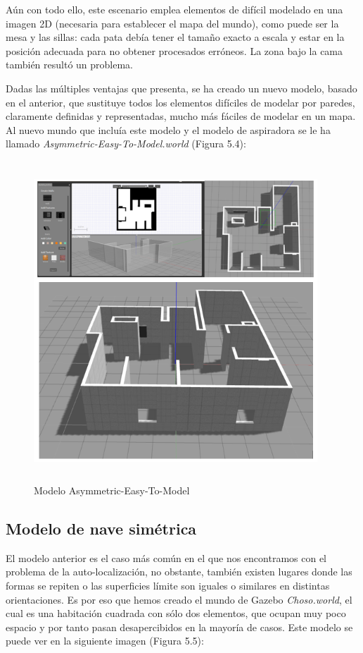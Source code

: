 Aún con todo ello, este escenario emplea elementos de difícil modelado en una imagen 2D (necesaria para establecer el mapa del mundo), como puede ser la mesa y las sillas: cada pata debía tener el tamaño exacto a escala y estar en la posición adecuada para no obtener procesados erróneos. La zona bajo la cama también resultó un problema. 

Dadas las múltiples ventajas que presenta, se ha creado un nuevo modelo, basado en el anterior, que sustituye todos los elementos difíciles de modelar por paredes, claramente definidas y representadas, mucho más fáciles de modelar en un mapa. Al nuevo mundo que incluía este modelo y el modelo de aspiradora se le ha llamado \textit{Asymmetric-Easy-To-Model.world} (Figura 5.4):

\begin{figure}[H]
  \begin{center}
    \includegraphics[width=0.95\textwidth, height=12cm]{figures/modeloasymmetric.png}
		\caption{Modelo Asymmetric-Easy-To-Model}
		\label{fig.modeloasymmetric}
		\end{center}
\end{figure} 

\subsection{Modelo de nave simétrica}
El modelo anterior es el caso más común en el que nos encontramos con el problema de la auto-localización, no obstante, también existen lugares donde las formas se repiten o las superficies límite son iguales o similares en distintas orientaciones. Es por eso que hemos creado el mundo de Gazebo \textit{Choso.world}, el cual es una habitación cuadrada con sólo dos elementos, que ocupan muy poco espacio y por tanto pasan desapercibidos en la mayoría de casos. Este modelo se puede ver en la siguiente imagen (Figura 5.5):

